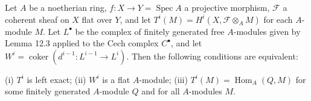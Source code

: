 Let $A$ be a noetherian ring, $f: X \to Y = \operatorname{Spec} A$ a projective morphism, $\mathcal{F}$ a coherent sheaf on $X$ flat over $Y$, and let $T^i(M) = H^i(X, \mathcal{F} \otimes_A M)$ for each $A$-module $M$. Let $L^\bullet$ be the complex of finitely generated free $A$-modules given by Lemma 12.3 applied to the Cech complex $C^\bullet$, and let $W^i = \operatorname{coker}(d^{i-1}: L^{i-1} \to L^i)$. Then the following conditions are equivalent:

(i) $T^i$ is left exact;
(ii) $W^i$ is a flat $A$-module;
(iii) $T^i(M) = \operatorname{Hom}_A(Q, M)$ for some finitely generated $A$-module $Q$ and for all $A$-modules $M$.
